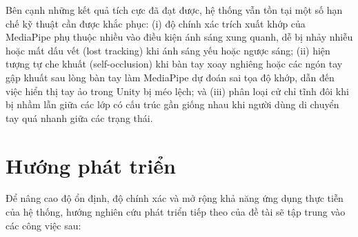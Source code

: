 \documentclass[../BTL.tex]{subfiles}
\begin{document}
Bên cạnh những kết quả tích cực đã đạt được, hệ thống vẫn tồn tại một số hạn chế kỹ thuật cần được khắc phục: (i) độ chính xác trích xuất khớp của MediaPipe phụ thuộc nhiều vào điều kiện ánh sáng xung quanh, dễ bị nhảy nhiễu hoặc mất dấu vết (lost tracking) khi ánh sáng yếu hoặc ngược sáng; (ii) hiện tượng tự che khuất (self-occlusion) khi bàn tay xoay nghiêng hoặc các ngón tay gập khuất sau lòng bàn tay làm MediaPipe dự đoán sai tọa độ khớp, dẫn đến việc hiển thị tay ảo trong Unity bị méo lệch; và (iii) phân loại cử chỉ tĩnh đôi khi bị nhầm lẫn giữa các lớp có cấu trúc gần giống nhau khi người dùng di chuyển tay quá nhanh giữa các trạng thái.

\section{Hướng phát triển}
\label{section:4.2}
Để nâng cao độ ổn định, độ chính xác và mở rộng khả năng ứng dụng thực tiễn của hệ thống, hướng nghiên cứu phát triển tiếp theo của đề tài sẽ tập trung vào các công việc sau:
\end{document}
